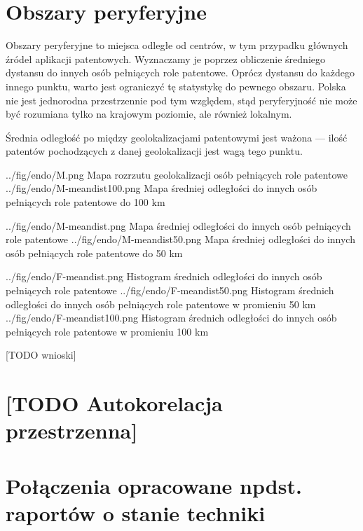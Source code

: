     \newpage\section
  {Obszary peryferyjne}

Obszary peryferyjne to miejsca odległe od centrów, w tym przypadku
głównych źródeł aplikacji patentowych. Wyznaczamy je poprzez obliczenie
średniego dystansu do innych osób pełniących role patentowe.
Oprócz dystansu do każdego innego punktu, warto jest ograniczyć
tę statystykę do pewnego obszaru. Polska nie jest jednorodna przestrzennie 
pod tym względem, stąd peryferyjność nie może być rozumiana tylko 
na krajowym poziomie, ale również lokalnym.

\begin{uwaga}
Średnia odległość po między geolokalizacjami patentowymi jest ważona ---
ilość patentów pochodzących z danej geolokalizacji jest wagą tego punktu.
\end{uwaga}

  \figsides
{../fig/endo/M.png}
{ Mapa rozrzutu geolokalizacji osób pełniących role patentowe }
{../fig/endo/M-meandist100.png}
{ Mapa średniej odległości do innych osób pełniących role patentowe do 100 km }

\figsides
{../fig/endo/M-meandist.png}
{ Mapa średniej odległości do innych osób pełniących role patentowe }
{../fig/endo/M-meandist50.png}
{ Mapa średniej odległości do innych osób pełniących role patentowe do 50 km }

\figsidesTri
{../fig/endo/F-meandist.png}
{ Histogram średnich odległości do innych osób pełniących role patentowe }
{../fig/endo/F-meandist50.png}
{ Histogram średnich odległości do innych osób pełniących role patentowe w promieniu 50 km }
{../fig/endo/F-meandist100.png}
{ Histogram średnich odległości do innych osób pełniących role patentowe w promieniu 100 km }

[TODO wnioski]




    \newpage\section
  {[TODO Autokorelacja przestrzenna]}




    \newpage\section
  {Połączenia opracowane npdst. raportów o stanie techniki}

